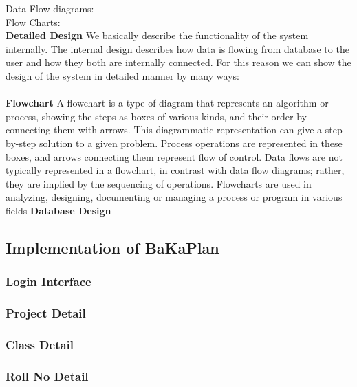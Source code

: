 Data Flow diagrams:
\\
\newpage
Flow Charts:
\\
{\centering \bf Detailed Design}
We basically describe the functionality of the system internally. The internal design describes how data is
flowing from database to the user and how they both are internally connected. For this reason we can show
the design of the system in detailed manner by many ways: \\\\
{\bf Flowchart } A flowchart is a type of diagram that represents an
algorithm or process, showing the steps as boxes of various kinds, and
their order by connecting them with arrows. This diagrammatic
representation can give a step-by-step solution to a given problem.
Process operations are represented in these boxes, and arrows
connecting them represent flow of control. Data flows are not
typically represented in a flowchart, in contrast with data flow
diagrams; rather, they are implied by the sequencing of operations.
Flowcharts are used in analyzing, designing, documenting or managing a
process or program in various fields
\newpage
{\bf Database Design}
\newpage
{}

\newpage

\subsection{Implementation of BaKaPlan}


\subsubsection{Login Interface}
\newpage
\subsubsection{Project Detail}
\newpage
\subsubsection{Class Detail}
\newpage
\subsubsection{Roll No Detail}
\newpage
